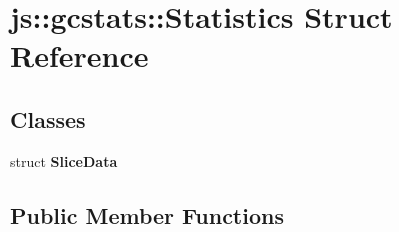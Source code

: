 \hypertarget{structjs_1_1gcstats_1_1_statistics}{\section{js\-:\-:gcstats\-:\-:Statistics Struct Reference}
\label{structjs_1_1gcstats_1_1_statistics}
}
\subsection*{Classes}
\begin{DoxyCompactItemize}
\item 
struct {\bfseries Slice\-Data}
\end{DoxyCompactItemize}
\subsection*{Public Member Functions}
